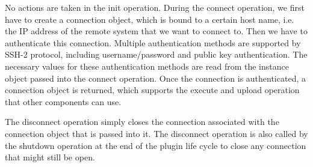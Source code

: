 No actions are taken in the init operation.
During the connect operation, we first have to create a connection object, which is bound to a certain host name, i.e. the IP address of the remote system that we want to connect to.
Then we have to authenticate this connection.
Multiple authentication methods are supported by SSH-2 protocol, including username/password and public key authentication.
The necessary values for these authentication methods are read from the instance object passed into the connect operation.
Once the connection is authenticated, a connection object is returned, which supports the execute and upload operation that other components can use.

The disconnect operation simply closes the connection associated with the connection object that is passed into it.
The disconnect operation is also called by the shutdown operation at the end of the plugin life cycle to close any connection that might still be open.
